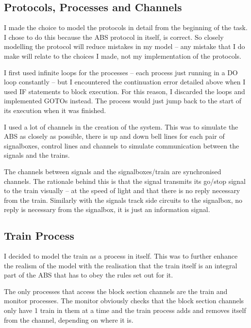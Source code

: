 \documentclass[10pt]{article}
\begin{document}
   \subsection{Protocols, Processes and Channels}
    I made the choice to model the protocols in detail from the beginning
    of the task. I chose to do this because the ABS protocol in itself, is
    correct. So closely modelling the protocol will reduce mistakes in my
    model -- any mistake that I do make will relate to the choices I made,
    not my implementation of the protocols.
  
    I first used infinite loops for the processes -- each process just running
    in a DO loop constantly -- but I encountered the continuation error
    detailed above when I used IF statements to block execution. 
    For this reason, I discarded the loops and implemented GOTOs instead.
    The process would just jump back to the start of its execution when it was
    finished.

    I used a lot of channels in the creation of the system.
    This was to simulate the ABS as closely as possible, there is up and down
    bell lines for each pair of signalboxes, control lines and channels to
    simulate communication between the signals and the trains.

    The channels between signals and the signalboxes/train are synchronised
    channels. The rationale behind this is that the signal transmits its go/stop
    signal to the train visually -- at the speed of light and that there is
    no reply necessary from the train. Similarly with the signals track side
    circuits to the signalbox, no reply is necessary from the signalbox, it is
    just an information signal.    

   \subsection{Train Process}
    I decided to model the train as a process in itself. This was to further
    enhance the realism of the model with the realisation that the train itself
    is an integral part of the ABS that has to obey the rules set out for it.

    The only processes that access the block section channels are the train and
    monitor processes. The monitor obviously checks that the block section
    channels only have 1 train in them at a time and the train process adds and
    removes itself from the channel, depending on where it is.  
\end{document}
